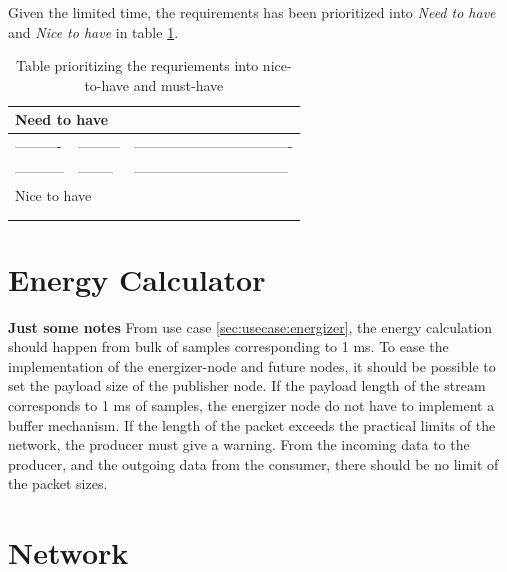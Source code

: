 Given the limited time, the requirements has been prioritized into \textit{Need to have} and \textit{Nice to have} in table \ref{sec:analysis:historian:tablefeatures}.
\begin{table}[h!]
\centering
\caption{Table prioritizing the requriements into nice-to-have and must-have}
\label{sec:analysis:historian:tablefeatures}
\begin{tabular}{l|l|l}

\multicolumn{3}{l}{Need to have}              \\ \hline
----------  & --------- & ---------------------------------- \\ \hline
----------- & --------  & --------------------------------- \\ \hline
\multicolumn{3}{l}{Nice to have}              \\ \hline
            &           &                       \\ \hline
            &           &                       \\ \hline
\end{tabular}
\end{table}

\section{Energy Calculator} \label{sec:analysis:energy}
\textbf{Just some notes}
From use case \ref{sec:usecase:energizer}, the energy calculation should happen from bulk of samples corresponding to 1 ms. To ease the implementation of the energizer-node and future nodes, it should be possible to set the payload size of the publisher node. If the payload length of the stream corresponds to 1 ms of samples, the energizer node do not have to implement a buffer mechanism. If the length of the packet exceeds the practical limits of the network, the producer must give a warning. From the incoming data to the producer, and the outgoing data from the consumer, there should be no limit of the packet sizes.

\section{Network} \label{sec:analysis:network}

